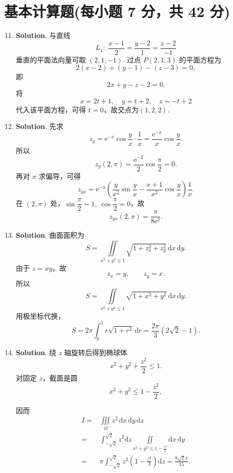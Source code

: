 \documentclass[../Main.tex]{subfiles}
\begin{document}
\section{基本计算题(每小题 7 分，共 42 分)}
\begin{enumerate}
  \setcounter{enumi}{10}
  \item \textbf{Solution}. 与直线
        \[
          L_1:\ \frac{x-1}{2}=\frac{y-2}{1}=\frac{z-2}{-1}
        \]
        垂直的平面法向量可取 \((2,1,-1)\). 过点 \(P(2,1,3)\) 的平面方程为
        \[
          2(x-2)+(y-1)-(z-3)=0,
        \]
        即
        \[
          2x+y-z-2=0.
        \]
        将
        \[
          x=2t+1,\quad y=t+2,\quad z=-t+2
        \]
        代入该平面方程，可得 \(t=0\)，故交点为$(1,2,2)$.

  \item \textbf{Solution}. 先求
        \[
          z_y=\mathrm{e}^{-x}\cos\frac{y}{x}\cdot \frac{1}{x}=\frac{\mathrm{e}^{-x}}{x}\cos\frac{y}{x}.
        \]
        所以
        \[
          z_y(2,\pi)=\frac{\mathrm{e}^{-2}}{2}\cos\frac{\pi}{2}=0.
        \]
        再对 \(x\) 求偏导，可得
        \[
          z_{yx}=\mathrm{e}^{-x}\left(\frac{y}{x^2}\sin\frac{y}{x}-\frac{x+1}{x^2}\cos\frac{y}{x}\right)\frac{1}{x}.
        \]
        在 \((2,\pi)\) 处，\(\sin\dfrac{\pi}{2}=1,\ \cos\dfrac{\pi}{2}=0\)，故
        \[
          z_{yx}(2,\pi)=\frac{\pi}{8\mathrm{e}^2}.
        \]

  \item \textbf{Solution}. 曲面面积为
        \[
          S=\iint\limits_{x^2+y^2\le 1}\sqrt{1+z_x^2+z_y^2}\,\mathrm{d}x\,\mathrm{d}y.
        \]
        由于 \(z=xy\)，故
        \[
          z_x=y,\qquad z_y=x.
        \]
        所以
        \[
          S=\iint\limits_{x^2+y^2\le 1}\sqrt{1+x^2+y^2}\,\mathrm{d}x\,\mathrm{d}y.
        \]
        用极坐标代换，
        \[
          S=2\pi\int_0^1 r\sqrt{1+r^2}\,\mathrm{d}r
          =\frac{2\pi}{3}(2\sqrt2-1).
        \]

  \item \textbf{Solution}. 绕 \(z\) 轴旋转后得到椭球体
        \[
          x^2+y^2+\frac{z^2}{2}\le 1.
        \]
        对固定 \(z\)，截面是圆
        \[
          x^2+y^2\le 1-\frac{z^2}{2},
        \]

        因而
        \[
          \begin{aligned}
            I= & \iiint\limits_{\Omega} z^2\,\mathrm{d}x\,\mathrm{d}y\,\mathrm{d}z                                             \\
            =  & \int_{-\sqrt{2}}^{\sqrt{2}} z^2\mathrm{d}z \iint\limits_{x^2+y^2\le 1-\frac{z^2}{2}} \mathrm{d}x\,\mathrm{d}y \\
            =  & \pi\int_{-\sqrt{2}}^{\sqrt{2}} z^2\left(1-\frac{z^2}{2}\right)\mathrm{d}z=\frac{8\sqrt{2}\pi}{15}.
          \end{aligned}
        \]


\end{enumerate}
\end{document}
